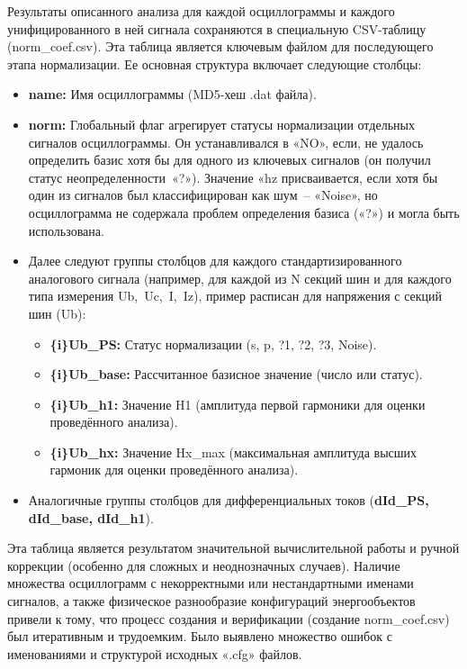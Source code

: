 Результаты описанного анализа для каждой осциллограммы и каждого унифицированного в ней сигнала сохраняются в специальную CSV-таблицу (norm\_coef.csv). Эта таблица является ключевым файлом для последующего этапа нормализации. Ее основная структура включает следующие столбцы:

\begin{itemize}
\item \textbf{name:} Имя осциллограммы (MD5-хеш .dat файла).
\item \textbf{norm:} Глобальный флаг агрегирует статусы нормализации отдельных сигналов осциллограммы. Он устанавливался в «NO», если, не удалось определить базис хотя бы для одного из ключевых сигналов (он получил статус неопределенности~«?»). Значение «hz присваивается, если хотя бы один из сигналов был классифицирован как шум~-- «Noise», но осциллограмма не содержала проблем определения базиса («?») и могла быть использована.
\item Далее следуют группы столбцов для каждого стандартизированного аналогового сигнала (например, для каждой из N секций шин и для каждого типа измерения Ub,~Uc,~I,~Iz), пример расписан для напряжения с секций шин (Ub):
  \begin{itemize}
  \item \textbf{\{i\}Ub\_PS:} Статус нормализации (s, p, ?1, ?2, ?3, Noise).
  \item \textbf{\{i\}Ub\_base:} Рассчитанное базисное значение (число или статус).
  \item \textbf{\{i\}Ub\_h1:} Значение H1 (амплитуда первой гармоники для оценки проведённого анализа).
  \item \textbf{\{i\}Ub\_hx:} Значение Hx\_max (максимальная амплитуда высших гармоник для оценки проведённого анализа).
  \end{itemize}
\item Аналогичные группы столбцов для дифференциальных токов (\textbf{dId\_\allowbreak PS, dId\_\allowbreak base, dId\_\allowbreak h1}).
\end{itemize}

Эта таблица является результатом значительной вычислительной работы и ручной коррекции (особенно для сложных и неоднозначных случаев). Наличие множества осциллограмм с некорректными или нестандартными именами сигналов, а также физическое разнообразие конфигураций энергообъектов привели к тому, что процесс создания и верификации (создание norm\_coef.csv) был итеративным и трудоемким. Было выявлено множество ошибок с именованиями и структурой исходных «.cfg» файлов.

